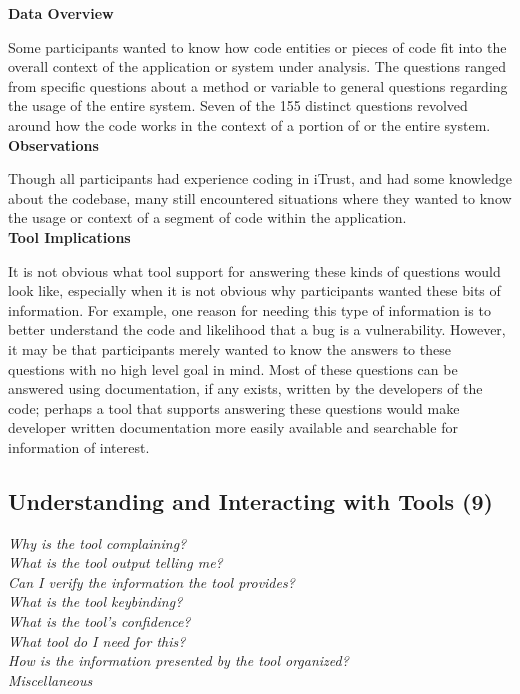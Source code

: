 \documentclass[conference]{IEEEtran}
\begin{document}
\noindent\textbf{Data Overview}

Some participants wanted to know how code entities or pieces of code fit into the overall context of the application or system under analysis. 
The questions ranged from specific questions about a method or variable to general questions regarding the usage of the entire system. 
Seven of the 155 distinct questions revolved around how the code works in the context of a portion of or the entire system.
\\

\noindent\textbf{Observations}

Though all participants had experience coding in iTrust, and had some knowledge about the codebase, many still encountered situations where they wanted to know the usage or context of a segment of code within the application. 
\\

\noindent\textbf{Tool Implications}

It is not obvious what tool support for answering these kinds of questions would look like, especially when it is not obvious why participants wanted these bits of information. 
For example, one reason for needing this type of information is to better understand the code and likelihood that a bug is a vulnerability. 
However, it may be that participants merely wanted to know the answers to these questions with no high level goal in mind.
Most of these questions can be answered using documentation, if any exists, written by the developers of the code; perhaps a tool that supports answering these questions would make developer written documentation more easily available and searchable for information of interest.





\noindent\subsection{\textbf{Understanding and Interacting with Tools (9)}}\label{uit}

\noindent\emph{Why is the tool complaining?} \\
\emph{What is the tool output telling me?} \\
\emph{Can I verify the information the tool provides?} \\
\emph{What is the tool keybinding?} \\
\emph{What is the tool's confidence?} \\
\emph{What tool do I need for this?} \\
\emph{How is the information presented by the tool organized?} \\
\emph{Miscellaneous} \\
\end{document}
